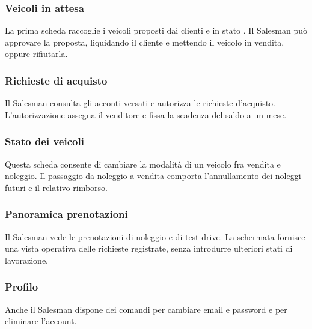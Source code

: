 \noindent\begin{minipage}{\linewidth}
\subsubsection{Veicoli in attesa}
La prima scheda raccoglie i veicoli proposti dai clienti e in stato . Il Salesman può approvare la proposta, liquidando il cliente e mettendo il veicolo in vendita, oppure rifiutarla.
\end{minipage}
\clearpage
\noindent\begin{minipage}{\linewidth}
\subsubsection{Richieste di acquisto}
Il Salesman consulta gli acconti versati e autorizza le richieste d'acquisto. L'autorizzazione assegna il venditore e fissa la scadenza del saldo a un mese.
\end{minipage}
\par\medskip
\noindent\begin{minipage}{\linewidth}
\subsubsection{Stato dei veicoli}
Questa scheda consente di cambiare la modalità di un veicolo fra vendita e noleggio. Il passaggio da noleggio a vendita comporta l'annullamento dei noleggi futuri e il relativo rimborso.
\end{minipage}
\clearpage
\noindent\begin{minipage}{\linewidth}
\subsubsection{Panoramica prenotazioni}
Il Salesman vede le prenotazioni di noleggio e di test drive. La schermata fornisce una vista operativa delle richieste registrate, senza introdurre ulteriori stati di lavorazione.
\end{minipage}
\par\medskip
\noindent\begin{minipage}{\linewidth}
\subsubsection{Profilo}
Anche il Salesman dispone dei comandi per cambiare email e password e per eliminare l'account.
\end{minipage}
\clearpage

